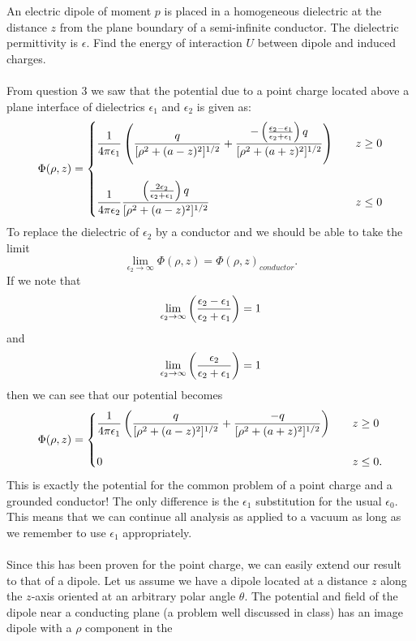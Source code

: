 \documentclass[11pt,letterpaper]{article}
\begin{document}
	\item
	An electric dipole of moment $p$ is placed in a homogeneous dielectric at the distance $z$ from the plane boundary of a semi-infinite
	conductor. The dielectric permittivity is $\epsilon$. Find the energy of interaction $U$ between dipole and induced charges.
	\\
	\\
	From question 3 we saw that the potential due to a point charge located above a plane interface of dielectrics $\epsilon_1$ and 
	$\epsilon_2$ is given as:
	\[
		\Phi(\rho,z) = \begin{cases}
		\displaystyle \frac{1}{4\pi\epsilon_1}\left(\frac{q}{ [\rho^2+(a-z)^2]^{1/2}}+\frac{-\left(\frac{\epsilon_2-\epsilon_1}{\epsilon_2+\epsilon_1}\right)
		q}{ [\rho^2+(a+z)^2]^{1/2}}\right)&\quad z\ge 0 \\ \\
		\displaystyle  \frac{1}{4\pi\epsilon_2}\frac{\left(\frac{2\epsilon_2}{\epsilon_2+\epsilon_1}\right)q}{ [\rho^2+(a-z)^2]^{1/2}}&\quad z\le0
		\end{cases}
	\]
	To replace the dielectric of $\epsilon_2$ by a conductor and we should be able to take the limit
	\[
		\lim_{\epsilon_2\to\infty}\Phi(\rho,z) = \Phi(\rho,z)_{conductor}.
	\]
	If we note that
	\[
		\lim_{\epsilon_2\to\infty} \left(\frac{\epsilon_2-\epsilon_1}{\epsilon_2+\epsilon_1}\right) = 1
	\]
	and 
	\[
		\lim_{\epsilon_2\to\infty} \left(\frac{\epsilon_2}{\epsilon_2+\epsilon_1}\right) = 1
	\]
	then we can see that our potential becomes
	\[
		\Phi(\rho,z) = \begin{cases}
		\displaystyle \frac{1}{4\pi\epsilon_1}\left(\frac{q}{ [\rho^2+(a-z)^2]^{1/2}}+\frac{-q}{ [\rho^2+(a+z)^2]^{1/2}}\right)&\quad z\ge 0 \\ \\
		\displaystyle  0 &\quad z\le0.
		\end{cases}
	\]
	This is exactly the potential for the common problem of a point charge and a grounded conductor! The only difference is the 
	$\epsilon_1$ substitution for the usual $\epsilon_0$. This means that we can continue all analysis as applied to a vacuum as long 
	as we remember to use $\epsilon_1$ appropriately. 
	\\
	\\
	Since this has been proven for the point charge, we can easily extend our result to that of a dipole. Let us assume we have a dipole
	located at a distance $z$ along the $z$-axis oriented at an arbitrary polar angle $\theta$. The potential and field of the
	dipole near a conducting plane (a problem well discussed in class) has an image dipole with a $\rho$ component in the 
\end{document}
